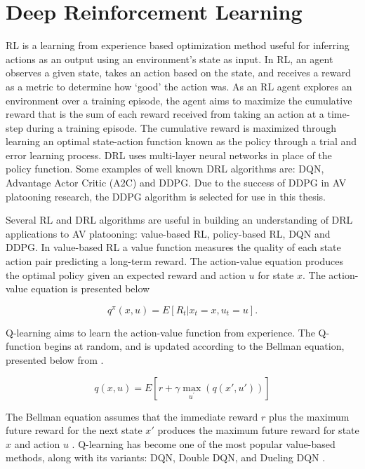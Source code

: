 \section{Deep Reinforcement Learning}
RL is a learning from experience based optimization method useful for inferring actions as
an output using an environment's state as input. In RL, an agent observes a given state,
takes an action based on the state, and receives a reward as a metric to determine how
`good' the action was.  As an RL agent explores an environment over a training episode,
the agent aims to maximize the cumulative reward that is the sum of each reward received
from taking an action at a time-step during a training episode.  The cumulative reward
is maximized through learning an optimal state-action function known as the policy through
a trial and error learning process.  DRL uses multi-layer neural networks in place of the
policy function.  Some examples of well known DRL algorithms are: DQN, Advantage Actor
Critic (A2C) and DDPG. Due to the success of DDPG in AV platooning research, the DDPG
algorithm is selected for use in this thesis.

Several RL and DRL algorithms are useful in building an understanding of DRL applications
to AV platooning: value-based RL, policy-based RL, DQN and DDPG. In value-based RL a value
function measures the quality of each state action pair predicting a long-term reward. The
action-value equation produces the optimal policy given an expected reward and action $u$
for state $x$. The action-value equation is presented below

\begin{equation}
    q^{\pi}(x,u) = E[R_t|x_t = x, u_t = u]. \label{eqn:act_val}
\end{equation}

Q-learning aims to learn the action-value function from experience. The Q-function begins at
random, and is updated according to the Bellman equation, presented below from
\cite{sutton2018reinforcement}.

\begin{equation}
    q(x,u) = E[r + \gamma\max_{u^{'}}(q(x', u'))] \label{eqn:bell}
\end{equation}

\noindent The Bellman equation assumes that the immediate reward $r$ plus the maximum
future reward for the next state $x'$ produces the maximum future reward for state $x$
and action $u$ \cite{Zhu2018}.  Q-learning has become one of the most popular value-based
methods, along with its variants: DQN, Double DQN, and Dueling DQN \cite{sWang2017}.

